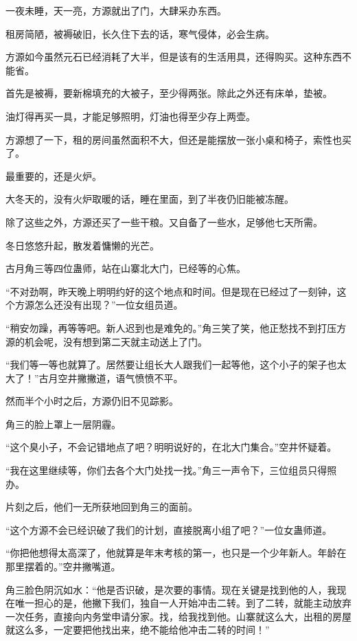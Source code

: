 
\begin{this_body}



一夜未睡，天一亮，方源就出了门，大肆采办东西。

租房简陋，被褥破旧，长久住下去的话，寒气侵体，必会生病。

方源如今虽然元石已经消耗了大半，但是该有的生活用具，还得购买。这种东西不能省。

首先是被褥，要新棉填充的大被子，至少得两张。除此之外还有床单，垫被。

油灯得再买一具，才能足够照明，灯油也得至少存上两壶。

方源想了一下，租的房间虽然面积不大，但还是能摆放一张小桌和椅子，索性也买了。

最重要的，还是火炉。

大冬天的，没有火炉取暖的话，睡在里面，到了半夜仍旧能被冻醒。

除了这些之外，方源还买了一些干粮。又自备了一些水，足够他七天所需。

冬日悠悠升起，散发着慵懒的光芒。

古月角三等四位蛊师，站在山寨北大门，已经等的心焦。

“不对劲啊，昨天晚上明明约好的这个地点和时间。但是现在已经过了一刻钟，这个方源怎么还没有出现？”一位女组员道。

“稍安勿躁，再等等吧。新人迟到也是难免的。”角三笑了笑，他正愁找不到打压方源的机会呢，没有想到第二天就主动送上了门。

“我们等一等也就算了。居然要让组长大人跟我们一起等他，这个小子的架子也太大了！”古月空井撇撇道，语气愤愤不平。

然而半个小时之后，方源仍旧不见踪影。

角三的脸上罩上一层阴霾。

“这个臭小子，不会记错地点了吧？明明说好的，在北大门集合。”空井怀疑着。

“我在这里继续等，你们去各个大门处找一找。”角三一声令下，三位组员只得照办。

片刻之后，他们一无所获地回到角三的面前。

“这个方源不会已经识破了我们的计划，直接脱离小组了吧？”一位女蛊师道。

“你把他想得太高深了，他就算是年末考核的第一，也只是一个少年新人。年龄在那里摆着的。”空井撇嘴道。

角三脸色阴沉如水：“他是否识破，是次要的事情。现在关键是找到他的人，我现在唯一担心的是，他撇下我们，独自一人开始冲击二转。到了二转，就能主动放弃一次任务，直接向内务堂申请分家。找，给我找到他。山寨就这么大，出租的房屋就这么多，一定要把他找出来，绝不能给他冲击二转的时间！”


\end{this_body}
